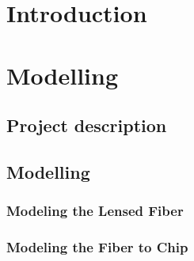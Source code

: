 
\chapter{Introduction}


%
%
%
%
%
%

\chapter{Modelling}

\newpage
\section{Project description}

\newpage
\section{Modelling}

\subsection{Modeling the Lensed Fiber}

\subsection{Modeling the Fiber to Chip}




